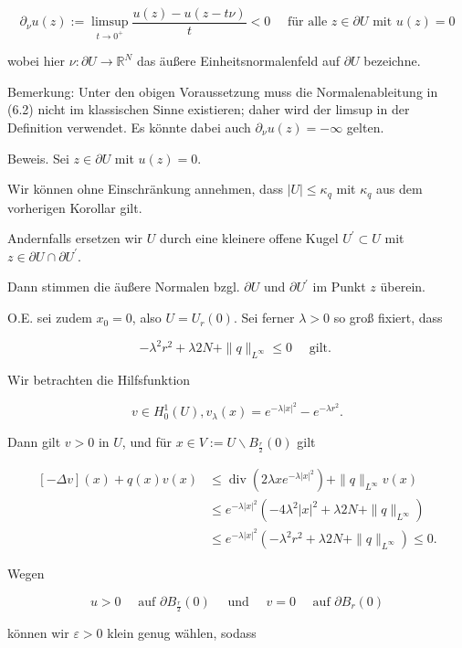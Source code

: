 \documentclass[10pt, letterpaper]{article}
\begin{document}
$$
\partial_{\nu} u(z):=\limsup _{t \rightarrow 0^{+}} \frac{u(z)-u(z-t \nu)}{t}<0 \quad \text { für alle } z \in \partial U \text { mit } u(z)=0
$$

wobei hier $\nu: \partial U \rightarrow \mathbb{R}^{N}$ das äußere Einheitsnormalenfeld auf $\partial U$ bezeichne.

Bemerkung: Unter den obigen Voraussetzung muss die Normalenableitung in (6.2) nicht im klassischen Sinne existieren; daher wird der limsup in der Definition verwendet. Es könnte dabei auch $\partial_{\nu} u(z)=-\infty$ gelten.

Beweis. Sei $z \in \partial U$ mit $u(z)=0$.

Wir können ohne Einschränkung annehmen, dass $|U| \leq \kappa_{q}$ mit $\kappa_{q}$ aus dem vorherigen Korollar gilt.

Andernfalls ersetzen wir $U$ durch eine kleinere offene Kugel $U^{\prime} \subset U$ mit $z \in \partial U \cap \partial U^{\prime}$.

Dann stimmen die äußere Normalen bzgl. $\partial U$ und $\partial U^{\prime}$ im Punkt $z$ überein.

O.E. sei zudem $x_{0}=0$, also $U=U_{r}(0)$. Sei ferner $\lambda>0$ so groß fixiert, dass

$$
-\lambda^{2} r^{2}+\lambda 2 N+\|q\|_{L^{\infty}} \leq 0 \quad \text { gilt. }
$$

Wir betrachten die Hilfsfunktion

$$
v \in H_{0}^{1}(U), v_{\lambda}(x)=e^{-\lambda|x|^{2}}-e^{-\lambda r^{2}} .
$$

Dann gilt $v>0$ in $U$, und für $x \in V:=U \backslash B_{\frac{r}{2}}(0)$ gilt

$$
\begin{aligned}
{[-\Delta v](x)+q(x) v(x) } & \leq \operatorname{div}\left(2 \lambda x e^{-\lambda|x|^{2}}\right)+\|q\|_{L^{\infty}} v(x) \\
& \leq e^{-\lambda|x|^{2}}\left(-4 \lambda^{2}|x|^{2}+\lambda 2 N+\|q\|_{L^{\infty}}\right) \\
& \leq e^{-\lambda|x|^{2}}\left(-\lambda^{2} r^{2}+\lambda 2 N+\|q\|_{L^{\infty}}\right) \leq 0 .
\end{aligned}
$$

Wegen

$$
u>0 \quad \text { auf } \partial B_{\frac{r}{2}}(0) \quad \text { und } \quad v=0 \quad \text { auf } \partial B_{r}(0)
$$

können wir $\varepsilon>0$ klein genug wählen, sodass
\end{document}
